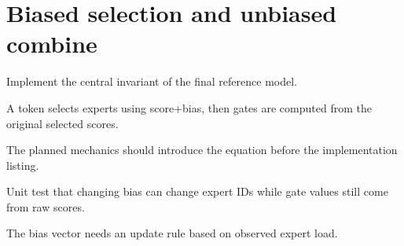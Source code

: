 \section{Biased selection and unbiased combine}
\label{sec:ch09-biased-selection-and-unbiased-combine}

Implement the central invariant of the final reference model.



A token selects experts using score+bias, then gates are computed from the original selected scores.



The planned mechanics should introduce the equation before the implementation listing.





\begin{checkpointbox}
Unit test that changing bias can change expert IDs while gate values still come from raw scores.
\end{checkpointbox}

The bias vector needs an update rule based on observed expert load.
